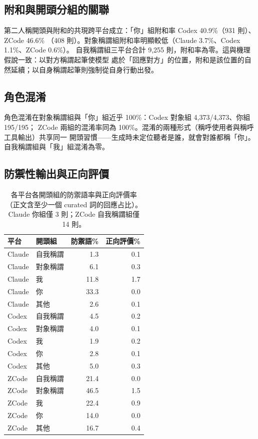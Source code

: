 \documentclass[10pt,twocolumn]{article}
\begin{document}
\subsection{附和與開頭分組的關聯}
第二人稱開頭與附和的共現跨平台成立：「你」組附和率 Codex 40.9\%（931 則）、ZCode 46.6\%
（408 則）。對象稱謂組附和率明顯較低（Claude 3.7\%、Codex 1.1\%、ZCode 0.6\%）。
自我稱謂組三平台合計 9{,}255 則，附和率為零。這與機理假說一致：以對方稱謂起筆使模型
處於「回應對方」的位置，附和是該位置的自然延續；以自身稱謂起筆則強制從自身行動出發。

\subsection{角色混淆}
角色混淆在對象稱謂組與「你」組近乎 100\%：Codex 對象組 4{,}373/4{,}373、你組 195/195；
ZCode 兩組的混淆率同為 100\%。混淆的兩種形式（稱呼使用者與稱呼工具輸出）共享同一
開頭習慣——生成時未定位聽者是誰，就會對誰都稱「你」。自我稱謂組與「我」組混淆為零。

\subsection{防禦性輸出與正向評價}

\begin{table}[t]
\centering
\small
\setlength{\tabcolsep}{6pt}
\begin{tabular}{llrr}
\toprule
平台 & 開頭組 & 防禦語\% & 正向評價\% \\
\midrule
Claude & 自我稱謂 & 1.3 & 0.1 \\
Claude & 對象稱謂 & 6.1 & 0.3 \\
Claude & 我 & 11.8 & 1.7 \\
Claude & 你 & 33.3 & 0.0 \\
Claude & 其他 & 2.6 & 0.1 \\
\midrule
Codex & 自我稱謂 & 4.5 & 0.2 \\
Codex & 對象稱謂 & 4.0 & 0.1 \\
Codex & 我 & 1.9 & 0.2 \\
Codex & 你 & 2.8 & 0.1 \\
Codex & 其他 & 5.0 & 0.3 \\
\midrule
ZCode & 自我稱謂 & 21.4 & 0.0 \\
ZCode & 對象稱謂 & 46.5 & 1.5 \\
ZCode & 我 & 22.4 & 0.9 \\
ZCode & 你 & 14.0 & 0.0 \\
ZCode & 其他 & 16.7 & 0.4 \\
\bottomrule
\end{tabular}
\caption{各平台各開頭組的防禦語率與正向評價率（正文含至少一個 curated 詞的回應占比）。
Claude 你組僅 3 則；ZCode 自我稱謂組僅 14 則。}
\label{tab:hedge}
\end{table}
\end{document}
